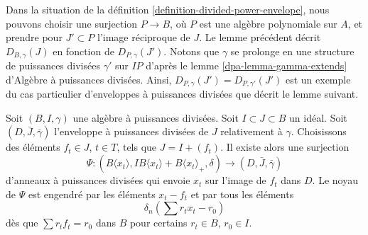 \noindent
Dans la situation de la définition \ref{definition-divided-power-envelope},
nous pouvons choisir une surjection $P \to B$, où $P$ est une algèbre
polynomiale sur $A$, et prendre pour $J' \subset P$ l'image réciproque de $J$.
Le lemme précédent décrit $D_{B, \gamma}(J)$ en fonction de
$D_{P, \gamma}(J')$. Notons que $\gamma$ se prolonge en une structure de puissances
divisées $\gamma'$ sur $IP$ d'après le
lemme \ref{dpa-lemma-gamma-extends} d'Algèbre à puissances divisées. Ainsi,
$D_{P, \gamma}(J') = D_{P, \gamma'}(J')$ est un exemple du cas particulier
d'enveloppes à puissances divisées que décrit le lemme suivant.

\begin{lemma}
\label{lemma-describe-divided-power-envelope}
Soit $(B, I, \gamma)$ une algèbre à puissances divisées. Soit $I \subset J \subset B$
un idéal. Soit $(D, \bar J, \bar \gamma)$ l'enveloppe à puissances divisées
de $J$ relativement à $\gamma$. Choisissons des éléments $f_t \in J$, $t \in T$, tels
que $J = I + (f_t)$. Il existe alors une surjection
$$
\Psi :
(B\langle x_t \rangle, IB\langle x_t \rangle + B\langle x_t \rangle_+, \delta)
\longrightarrow
(D, \bar J, \bar \gamma)
$$
d'anneaux à puissances divisées qui envoie $x_t$ sur l'image de $f_t$ dans $D$.
Le noyau de $\Psi$ est engendré par les éléments $x_t - f_t$ et par tous les
éléments
$$
\delta_n\left(\sum r_t x_t - r_0\right)
$$
dès que $\sum r_t f_t = r_0$ dans $B$ pour certains $r_t \in B$, $r_0 \in I$.
\end{lemma}

